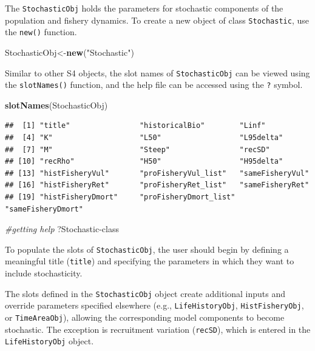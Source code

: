 \documentclass[
]{book}
\newenvironment{Shaded}{\begin{snugshade}}{\end{snugshade}}
\newcommand{\AttributeTok}[1]{\textcolor[rgb]{0.13,0.29,0.53}{#1}}
\newcommand{\CommentTok}[1]{\textcolor[rgb]{0.56,0.35,0.01}{\textit{#1}}}
\newcommand{\FunctionTok}[1]{\textcolor[rgb]{0.13,0.29,0.53}{\textbf{#1}}}
\newcommand{\NormalTok}[1]{#1}
\newcommand{\OtherTok}[1]{\textcolor[rgb]{0.56,0.35,0.01}{#1}}
\newcommand{\StringTok}[1]{\textcolor[rgb]{0.31,0.60,0.02}{#1}}
\begin{document}
The \texttt{StochasticObj} holds the parameters for stochastic components of the population and fishery dynamics.
To create a new object of class \texttt{Stochastic}, use the \texttt{new()} function.

\begin{Shaded}
\begin{Highlighting}[]
\NormalTok{StochasticObj}\OtherTok{\textless{}{-}}\FunctionTok{new}\NormalTok{(}\StringTok{"Stochastic"}\NormalTok{)}
\end{Highlighting}
\end{Shaded}

Similar to other S4 objects, the slot names of \texttt{StochasticObj} can be viewed using the \texttt{slotNames()} function, and the help file can be accessed using the \texttt{?} symbol.

\begin{Shaded}
\begin{Highlighting}[]
\FunctionTok{slotNames}\NormalTok{(StochasticObj)}
\end{Highlighting}
\end{Shaded}

\begin{verbatim}
##  [1] "title"                "historicalBio"        "Linf"                
##  [4] "K"                    "L50"                  "L95delta"            
##  [7] "M"                    "Steep"                "recSD"               
## [10] "recRho"               "H50"                  "H95delta"            
## [13] "histFisheryVul"       "proFisheryVul_list"   "sameFisheryVul"      
## [16] "histFisheryRet"       "proFisheryRet_list"   "sameFisheryRet"      
## [19] "histFisheryDmort"     "proFisheryDmort_list" "sameFisheryDmort"
\end{verbatim}

\begin{Shaded}
\begin{Highlighting}[]
\CommentTok{\#getting help}
\NormalTok{?}\StringTok{\textasciigrave{}}\AttributeTok{Stochastic{-}class}\StringTok{\textasciigrave{}}  
\end{Highlighting}
\end{Shaded}

To populate the slots of \texttt{StochasticObj}, the user should begin by defining a meaningful title (\texttt{title}) and specifying the parameters in which they want to include stochasticity.

The slots defined in the \texttt{StochasticObj} object create additional inputs and override parameters specified elsewhere (e.g., \texttt{LifeHistoryObj}, \texttt{HistFisheryObj}, or \texttt{TimeAreaObj}), allowing the corresponding model components to become stochastic. The exception is recruitment variation (\texttt{recSD}), which is entered in the \texttt{LifeHistoryObj} object.
\end{document}
